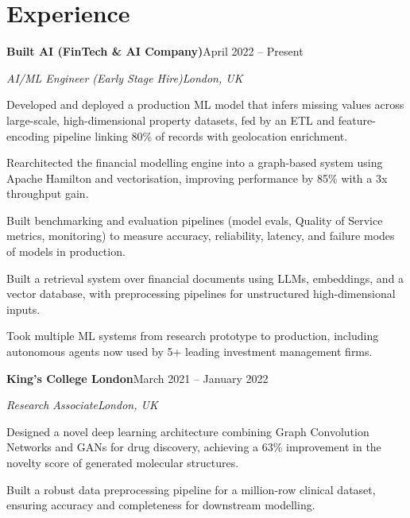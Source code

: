 \documentclass[10pt,a4paper]{article}
\newcommand{\entry}[4]{%
  {\color{company}\bfseries #1}\hfill {\color{muted}#2}\par
  \vspace{1pt}
  {\itshape #3}\hfill {\color{muted}\itshape #4}\par
  \vspace{3pt}%
}
\begin{document}
\section{Experience}
\entry{Built AI (FinTech \& AI Company)}{April 2022 -- Present}{AI/ML Engineer (Early Stage Hire)}{London, UK}
\begin{tight}
  \item Developed and deployed a production ML model that infers missing values across large-scale, high-dimensional property datasets, fed by an ETL and feature-encoding pipeline linking 80\% of records with geolocation enrichment.
  \item Rearchitected the financial modelling engine into a graph-based system using Apache Hamilton and vectorisation, improving performance by 85\% with a 3x throughput gain.
  \item Built benchmarking and evaluation pipelines (model evals, Quality of Service metrics, monitoring) to measure accuracy, reliability, latency, and failure modes of models in production.
  \item Built a retrieval system over financial documents using LLMs, embeddings, and a vector database, with preprocessing pipelines for unstructured high-dimensional inputs.
  \item Took multiple ML systems from research prototype to production, including autonomous agents now used by 5+ leading investment management firms.
\end{tight}

\entry{King's College London}{March 2021 -- January 2022}{Research Associate}{London, UK}
\begin{tight}
  \item Designed a novel deep learning architecture combining Graph Convolution Networks and GANs for drug discovery, achieving a 63\% improvement in the novelty score of generated molecular structures.
  \item Built a robust data preprocessing pipeline for a million-row clinical dataset, ensuring accuracy and completeness for downstream modelling.
\end{tight}

\end{document}
